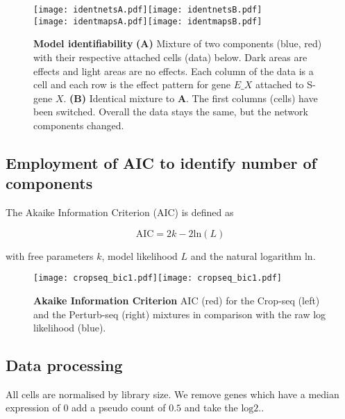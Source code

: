 \documentclass[12pt]{article}
\begin{document}
\begin{figure}
\begin{center}
\texttt{[image: identnetsA.pdf]}\hspace{2cm}\texttt{[image: identnetsB.pdf]}\\
\texttt{[image: identmapsA.pdf]}\hspace{2cm}\texttt{[image: identmapsB.pdf]}
\caption{\textbf{Model identifiability} \textbf{(A)} Mixture of two components (blue, red) with their respective attached cells (data) below. Dark areas are effects and light areas are no effects. Each column of the data is a cell and each row is the effect pattern for gene $E\_X$ attached to S-gene $X$. \textbf{(B)} Identical mixture to \textbf{A}. The first columns (cells) have been switched. Overall the data stays the same, but the network components changed.}\label{fig:ident}
\end{center}
\end{figure}

\subsection{Employment of AIC to identify number of components}

The Akaike Information Criterion (AIC) is defined as

\begin{equation}
\mathrm{AIC} = 2k - 2\mathrm{ln}\left(L\right)
\end{equation}

with free parameters $k$, model likelihood $L$ and the natural logarithm $\mathrm{ln}$.

\begin{figure}
\texttt{[image: cropseq\_bic1.pdf]}\texttt{[image: cropseq\_bic1.pdf]}
\caption{\textbf{Akaike Information Criterion} AIC (red) for the Crop-seq (left) and the Perturb-seq (right) mixtures in comparison with the raw log likelihood (blue).}\label{fig:bics}
\end{figure}

\subsection{Data processing}

All cells are normalised by library size. We remove genes which have a median expression of $0$ add a pseudo count of $0.5$ and take the $\mathrm{log2}$..
\end{document}
